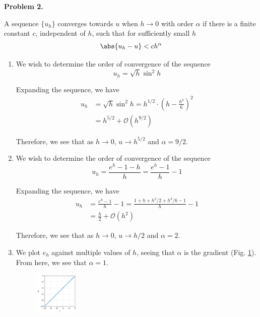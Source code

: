 \textbf{Problem 2.}

A sequence $\{u_h\}$ converges towards $u$ when $h\rightarrow0$ with order $\alpha$ if there is a finite constant $c$, independent of $h$, such that for sufficiently small $h$
\begin{align*}
    \abs{u_h-u} < ch^\alpha
\end{align*}

\begin{enumerate}[label=(\roman*),leftmargin=*,itemsep=0mm]
    
    \item We wish to determine the order of convergence of the sequence
    $$u_h = \sqrt{h}\sin^2 h$$
    
    Expanding the sequence, we have
    \begin{align*}
        u_h &= \sqrt{h}\sin^2 h
        = h^{1/2} \cdot \left(h-\frac{h^3}{6}\right)^2 \\
        &= h^{5/2} + \mathcal{O}(h^{9/2})
    \end{align*}
    
    Therefore, we see that as $h\rightarrow0$, $u\rightarrow h^{5/2}$ and $\alpha = 9/2$.
    
    \item We wish to determine the order of convergence of the sequence
    $$u_h = \frac{e^h-1-h}{h} = \frac{e^h-1}{h} - 1$$
    
    Expanding the sequence, we have
    \begin{align*}
        u_h &= \frac{e^h-1}{h} - 1
        = \frac{1 + h + h^2/2 + h^3/6 - 1}{h} - 1 \\
        &= \frac{h}{2} + \mathcal{O}(h^2)
    \end{align*}
    
    Therefore, we see that as $h\rightarrow0$, $u\rightarrow h/2$ and $\alpha = 2$.
    
    \item We plot $e_h$ against multiple values of $h$, seeing that $\alpha$ is the gradient (Fig. \ref{hw2_qn2}).  From here, we see that $\alpha = 1$.
    
    \begin{figure}[h!]
    \centering
    \includegraphics[width=0.2\textwidth]{figures/hw2_qn2.png}\\
    \caption{}
    \label{hw2_qn2}
    \end{figure}
    
\end{enumerate}